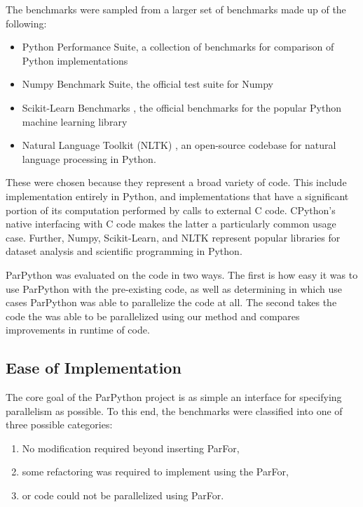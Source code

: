 \documentclass[conference]{IEEEtran}
\begin{document}
The benchmarks were sampled from a larger set of benchmarks made up of the following:
\begin{itemize}
   \item Python Performance Suite\cite{pyPerformance}, a collection of benchmarks for comparison of Python implementations
   \item Numpy Benchmark Suite\cite{numpyPerformance}, the official test suite for Numpy 
   \item Scikit-Learn Benchmarks \cite{scikit-learn}, the official benchmarks for the popular Python machine learning library
   \item Natural Language Toolkit (NLTK) \cite{bird_2016}, an 
   open-source codebase for natural language processing in Python.
\end{itemize}
These were chosen because they represent a broad variety of code. 
This include implementation entirely in Python, and implementations 
that have a significant portion of its computation performed by calls to external C code.
CPython's native interfacing with C code makes the latter a particularly common usage case.
Further, Numpy, Scikit-Learn, and NLTK represent popular libraries for dataset analysis and scientific programming in Python.


ParPython was evaluated on the code in two ways. The first is how
easy it was to use ParPython with the pre-existing code, as well as 
determining in which use cases ParPython was able to 
parallelize the code at all.
The second takes the code the was able to be parallelized using our method and compares improvements in runtime of code.

\subsection{Ease of Implementation}

The core goal of the ParPython project is as simple an interface for specifying parallelism as possible. To this end, 
the benchmarks were classified into one of three possible categories:
\begin{enumerate}
   \item No modification required beyond inserting ParFor,
   \item some refactoring was required to implement using the ParFor,
   \item or code could not be parallelized using ParFor.
\end{enumerate}
\end{document}
